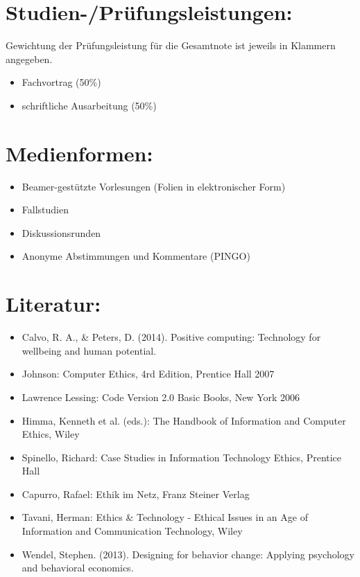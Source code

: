 \section*{Studien-/Prüfungsleistungen:\label{/mi-2017/modulbeschreibungen-master/MA_All_Computerethik}}\label{studien-pruxfcfungsleistungenpathlabelmi-2017modulbeschreibungen-mastermaux5fallux5fcomputerethik}

Gewichtung der Prüfungsleistung für die Gesamtnote ist jeweils in
Klammern angegeben.

\begin{itemize}
\tightlist
\item
  Fachvortrag (50\%)
\item
  schriftliche Ausarbeitung (50\%)
\end{itemize}

\section*{Medienformen:\label{/mi-2017/modulbeschreibungen-master/MA_All_Computerethik}}\label{medienformenpathlabelmi-2017modulbeschreibungen-mastermaux5fallux5fcomputerethik}

\begin{itemize}
\tightlist
\item
  Beamer-gestützte Vorlesungen (Folien in elektronischer Form)
\item
  Fallstudien
\item
  Diskussionsrunden
\item
  Anonyme Abstimmungen und Kommentare (PINGO)
\end{itemize}

\section*{Literatur:\label{/mi-2017/modulbeschreibungen-master/MA_All_Computerethik}}\label{literaturpathlabelmi-2017modulbeschreibungen-mastermaux5fallux5fcomputerethik}

\begin{itemize}
\tightlist
\item
  Calvo, R. A., \& Peters, D. (2014). Positive computing: Technology for
  wellbeing and human potential.
\item
  Johnson: Computer Ethics, 4rd Edition, Prentice Hall 2007
\item
  Lawrence Lessing: Code Version 2.0 Basic Books, New York 2006
\item
  Himma, Kenneth et al. (eds.): The Handbook of Information and Computer
  Ethics, Wiley
\item
  Spinello, Richard: Case Studies in Information Technology Ethics,
  Prentice Hall
\item
  Capurro, Rafael: Ethik im Netz, Franz Steiner Verlag
\item
  Tavani, Herman: Ethics \& Technology - Ethical Issues in an Age of
  Information and Communication Technology, Wiley
\item
  Wendel, Stephen. (2013). Designing for behavior change: Applying
  psychology and behavioral economics.
\end{itemize}

